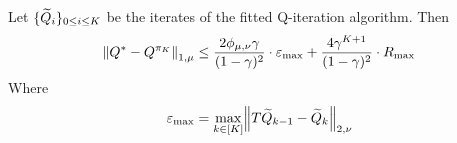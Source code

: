 
\begin{thm}\label{thm:errorprop}
	Let $\{\widetilde{Q}_i\}_{0\leq i\leq K}$ be the iterates of the fitted Q-iteration algorithm.
	Then
	\begin{equation*}
	  \norm{Q^* - Q^{\pi_K}}_{1, \mu}
	  \leq \frac{2 \phi_{\mu,\nu} \gamma}{(1-\gamma)^2} \cdot \varepsilon_{\max}
	  + \frac{4 \gamma^{K+1}}{(1-\gamma)^2} \cdot R_{\max}
	\end{equation*}
	Where
	\[ \varepsilon_{\max}
	= \max_{k \in [K]} \norm{T\widetilde{Q}_{k-1} - \widetilde{Q}_k}_{2,\nu} \] 
\end{thm}
